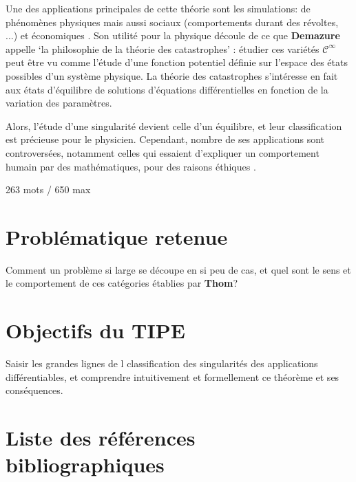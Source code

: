 \documentclass{article}
\begin{document}
Une des applications principales de cette théorie sont les simulations: de phénomènes physiques mais aussi sociaux (comportements durant des révoltes, ...) et économiques \cite{bbcvid} \cite{poston}.
Son utilité pour la physique découle de ce que \textbf{Demazure} appelle `la philosophie de la théorie des catastrophes' \cite{demazure}: étudier ces variétés $\mathcal{C}^\infty$ peut être vu comme l'étude d'une fonction potentiel définie sur l'espace des états possibles d'un système physique.
La théorie des catastrophes s'intéresse en fait aux états d'équilibre de solutions d'équations différentielles en fonction de la variation des paramètres.

Alors, l'étude d'une singularité devient celle d'un équilibre, et leur classification est précieuse pour le physicien.
Cependant, nombre de ses applications sont controversées, notamment celles qui essaient d'expliquer un comportement humain par des mathématiques, pour des raisons éthiques \cite{wikipedia}.

\bigskip

\small{263 mots / 650 max}

\section{Problématique retenue}

Comment un problème si large se découpe en si peu de cas, et quel sont le sens et le comportement de ces catégories établies par \textbf{Thom}?

\section{Objectifs du TIPE}

Saisir les grandes lignes de l classification des singularités des applications différentiables, et comprendre intuitivement et formellement ce théorème et ses conséquences.

\section{Liste des références bibliographiques}

\renewcommand\refname{\vskip -1cm}


\end{document}
